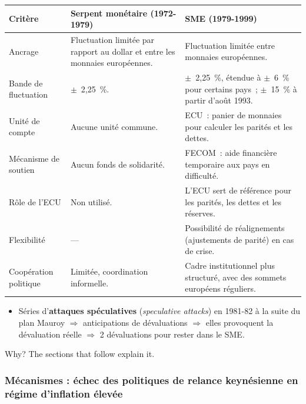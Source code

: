 \begin{center}
  \small
  \begin{tabularx}{\textwidth}{>{\raggedright\arraybackslash}p{2.9cm}
      >{\raggedright\arraybackslash}X >{\raggedright\arraybackslash}X}
    \toprule
    Critère & Serpent monétaire (1972-1979) & SME (1979-1999) \\
    \midrule
    Ancrage & Fluctuation limitée par rapport au dollar et entre les monnaies
      européennes. & Fluctuation limitée entre monnaies européennes. \\
    \addlinespace
    Bande de fluctuation & $\pm$~2,25~\%. & $\pm$~2,25~\%, étendue à $\pm$~6~\% pour
      certains pays~; $\pm$~15~\% à partir d'août 1993. \\
    \addlinespace
    Unité de compte & Aucune unité commune. & ECU~: panier de monnaies pour calculer les
      parités et les dettes. \\
    \addlinespace
    Mécanisme de soutien & Aucun fonds de solidarité. & FECOM~: aide financière
      temporaire aux pays en difficulté. \\
    \addlinespace
    Rôle de l'ECU & Non utilisé. & L'ECU sert de référence pour les parités, les dettes
      et les réserves. \\
    \addlinespace
    Flexibilité & --- & Possibilité de réalignements (ajustements de parité) en cas de
      crise. \\
    \addlinespace
    Coopération politique & Limitée, coordination informelle. & Cadre institutionnel
      plus structuré, avec des sommets européens réguliers. \\
    \bottomrule
  \end{tabularx}
\end{center}

\begin{itemize}
  \item Séries d'\textbf{attaques spéculatives} (\textit{speculative attacks}) en
    1981-82 à la suite du plan Mauroy $\Rightarrow$ anticipations de dévaluations
    $\Rightarrow$ elles provoquent la dévaluation réelle $\Rightarrow$ 2 dévaluations
    pour rester dans le SME.
\end{itemize}
Why? The sections that follow explain it.

\subsubsection{Mécanismes : échec des politiques de relance keynésienne en régime d'inflation élevée}

